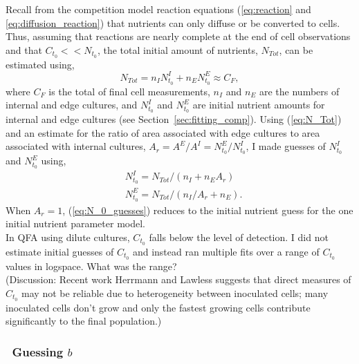 Recall from the competition model reaction equations
(\ref{eq:reaction} and \ref{eq:diffusion_reaction}) that nutrients can
only diffuse or be converted to cells. Thus, assuming that
reactions are nearly complete at the end of cell observations and that
\(C_{t_{0}} << N_{t_{0}}\), the total initial amount of nutrients,
\(N_{Tot}\), can be estimated using,
\begin{equation}
  \label{eq:N_Tot}
  N_{Tot} = n_{I}N^{I}_{t_{0}} + n_{E}N^{E}_{t_{0}} \approx C_{F},
\end{equation}
where \(C_{F}\) is the total of final cell measurements, \(n_{I}\) and
\(n_{E}\) are the numbers of internal and edge cultures, and
\(N^{I}_{t_{0}}\) and \(N^{E}_{t_{0}}\) are initial nutrient amounts
for internal and edge cultures (see
Section~\ref{sec:fitting_comp}). Using (\ref{eq:N_Tot}) and an estimate
for the ratio of area associated with edge cultures to area associated
with internal cultures,
\(A_{r} = A^{E} / A^{I} = N^{E}_{t_{0}} / N^{I}_{t_{0}}\), I made
guesses of \(N^{I}_{t_{0}}\) and \(N^{E}_{t_{0}}\) using,
%
\begin{equation}
  \label{eq:N_0_guesses}
  \begin{aligned}
    &N^{I}_{t_{0}} = N_{Tot} / (n_{I} + n_{E}A_{r})\\
    &N^{E}_{t_{0}} = N_{Tot} / (n_{I}/A_{r} + n_{E}).
  \end{aligned}
\end{equation}
%
When \(A_{r} = 1\), (\ref{eq:N_0_guesses}) reduces to the initial
nutrient guess for the one initial nutrient parameter model.
\\
In QFA using dilute cultures, \(C_{t_{0}}\) falls below the level of
detection.  I did not estimate initial guesses of \(C_{t_{0}}\) and
instead ran multiple fits over a range of \(C_{t_{0}}\) values in
logspace. What was the range?
\\
(Discussion: Recent work Herrmann and Lawless suggests that direct
measures of \(C_{t_{0}}\) may not be reliable due to heterogeneity
between inoculated cells; many inoculated cells don't grow and only
the fastest growing cells contribute significantly to the final
population.)
\subsubsection{\boldmath \thesubsubsection~Guessing  \(b\) \unboldmath}


